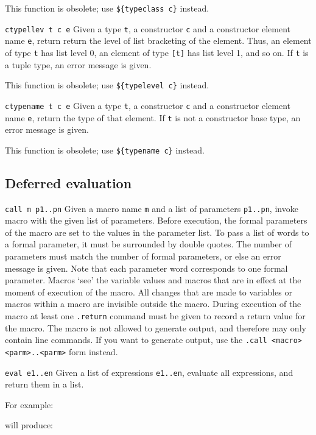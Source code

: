 \begin{desctab}
This function is obsolete; use \verb'${typeclass c}' instead.
\item[\texttt{ctypellev t c e}]
Given a type \texttt{t}, a constructor \texttt{c} and a constructor element name
\texttt{e}, return return the level of list bracketing of the element. Thus,
an element of type \verb't' has list level 0, an element of type
\verb'[t]' has list level 1, and so on.  If \texttt{t} is a tuple type,
an error message is given.

This function is obsolete; use \verb'${typelevel c}' instead.

\item[\texttt{ctypename t c e}]
Given a type \texttt{t},
a constructor \texttt{c}
and a constructor element name \texttt{e},
return the type of that element.
If \texttt{t} is not a constructor base type, an error message is given.

This function is obsolete; use \verb'${typename c}' instead.
\end{desctab}

\subsection{Deferred evaluation}
\begin{desctab}
\item[\texttt{call m p1..pn}]
Given a macro name \verb+m+ and a list of parameters \verb+p1..pn+,
invoke macro with the given list of parameters.
Before execution,
the formal parameters of the macro are set to the values in the parameter list.
To pass a list of words to a formal parameter,
it must be surrounded by double quotes.
The number of parameters must match the number of formal parameters,
or else an error message is given.
Note that each parameter word corresponds to one formal parameter.
Macros `see' the variable values and macros that are in effect at the moment
of execution of the macro.
All changes that are made to variables or macros within a macro
are invisible outside the macro.
During execution of the macro at least one \verb+.return+ command must be
given to record a return value for the macro.
The macro is not allowed to generate output, and therefore may only contain
line commands.
If you want to generate output, 
use the \verb+.call <macro> <parm>..<parm>+ form instead.

\item[\texttt{eval e1..en}]
Given a list of expressions \verb+e1..en+, evaluate all expressions,
and return them in a list.
\end{desctab}
For example:
\begin{showfile}

\end{showfile}
will produce:
\begin{showfile}

\end{showfile}

